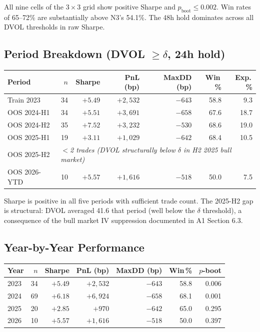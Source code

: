 \documentclass[12pt, a4paper]{article}
\theoremstyle{plain}
\theoremstyle{definition}
\begin{document}
All nine cells of the $3 \times 3$ grid show positive Sharpe and
$p_{\mathrm{boot}} \leq 0.002$.  Win rates of 65--72\% are substantially
above N3's 54.1\%.  The 48h hold dominates across all DVOL thresholds
in raw Sharpe.

\subsection{Period Breakdown (DVOL $\geq \delta$, 24h hold)}

\begin{center}
\begin{tabular}{lrrrrrr}
\toprule
Period & $n$ & Sharpe & PnL (bp) & MaxDD (bp) & Win\,\% & Exp.\,\% \\
\midrule
Train 2023    & 34 & $+5.49$ & $+2{,}532$ & $-643$ & 58.8 &  9.3 \\
OOS 2024-H1   & 34 & $+5.51$ & $+3{,}691$ & $-658$ & 67.6 & 18.7 \\
OOS 2024-H2   & 35 & $+7.52$ & $+3{,}232$ & $-530$ & 68.6 & 19.0 \\
OOS 2025-H1   & 19 & $+3.11$ & $+1{,}029$ & $-642$ & 68.4 & 10.5 \\
OOS 2025-H2   & \multicolumn{6}{l}{\textit{$<$2 trades (DVOL structurally below $\delta$ in H2 2025 bull market)}} \\
OOS 2026-YTD  & 10 & $+5.57$ & $+1{,}616$ & $-518$ & 50.0 &  7.5 \\
\bottomrule
\end{tabular}
\end{center}

Sharpe is positive in all five periods with sufficient trade count.
The 2025-H2 gap is structural: DVOL averaged 41.6 that period
(well below the $\delta$ threshold), a consequence of the bull market
IV suppression documented in A1 Section 6.3.

\subsection{Year-by-Year Performance}

\begin{center}
\begin{tabular}{lrrrrrr}
\toprule
Year & $n$ & Sharpe & PnL (bp) & MaxDD (bp) & Win\,\% & $p$-boot \\
\midrule
2023 & 34 & $+5.49$ & $+2{,}532$ & $-643$   & 58.8 & 0.006 \\
2024 & 69 & $+6.18$ & $+6{,}924$ & $-658$   & 68.1 & 0.001 \\
2025 & 20 & $+2.85$ & $+970$     & $-642$   & 65.0 & 0.295 \\
2026 & 10 & $+5.57$ & $+1{,}616$ & $-518$   & 50.0 & 0.397 \\
\bottomrule
\end{tabular}
\end{center}
\end{document}
